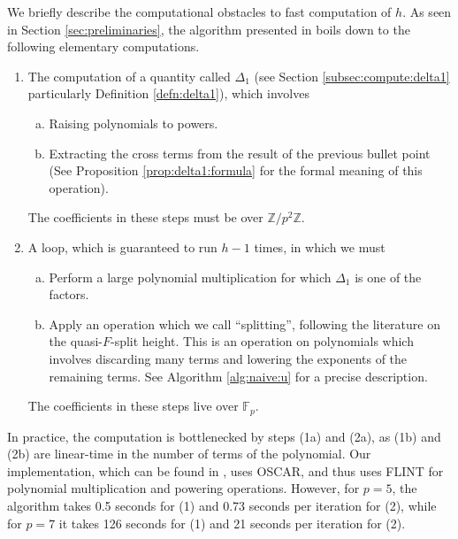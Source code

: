 We briefly describe the computational obstacles to fast computation
of \(h\).
As seen in Section \ref{sec:preliminaries},
the algorithm presented in \cite{kty-2022-fedder} boils down to the 
following elementary computations.

\begin{enumerate}[(1)]
    \item The computation of a quantity 
        called \(\Delta_{1}\) (see Section \ref{subsec:compute:delta1}
        particularly Definition \ref{defn:delta1}),
        which involves
        \begin{enumerate}[(a)]
            \item Raising polynomials to powers.
            \item Extracting the cross terms from 
                the result of the previous bullet point
                (See Proposition \ref{prop:delta1:formula}
                for the formal meaning of this operation).
        \end{enumerate}
        The coefficients in these steps must be over 
        \(\mathbb{Z} / p^{2} \mathbb{Z}\).
    \item A loop, which is guaranteed to run \(h-1\) times, in which we must
        \begin{enumerate}[(a)]
            \item Perform a large polynomial multiplication 
                for which \(\Delta_{1}\) is one of the factors.
            \item Apply an operation which we call ``splitting'', 
                following the literature on the
                quasi-\(F\)-split height.
                This is an operation on polynomials which involves
                discarding many terms and lowering the exponents of
                the remaining terms.
                See Algorithm \ref{alg:naive:u} for a precise description.
        \end{enumerate}
        The coefficients in these steps live over \(\mathbb{F}_{p}\).
\end{enumerate}

In practice, the computation is bottlenecked by steps 
(1a) and (2a), as (1b) and (2b) are linear-time in the number of
terms of the polynomial.
Our implementation, which can be found in 
\cite{mmpsingularities-jl}, uses OSCAR, and thus uses FLINT
for polynomial multiplication and powering operations.
However, for \(p = 5\), the algorithm
takes 0.5 seconds for (1) and 0.73 seconds per iteration for (2),
while for \(p = 7\) it takes 126 seconds for (1) and
21 seconds per iteration for (2).

